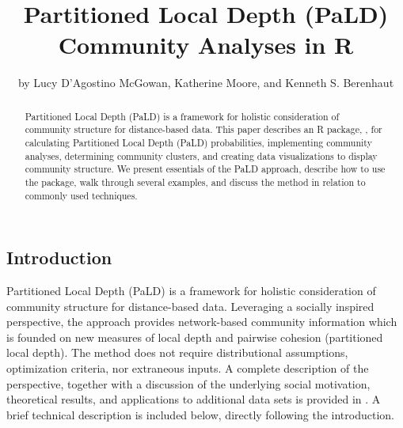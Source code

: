 \title{Partitioned Local Depth (PaLD) Community Analyses in R}

\author{by Lucy D'Agostino McGowan, Katherine Moore, and Kenneth S. Berenhaut}

\maketitle

\begin{abstract}%
Partitioned Local Depth (PaLD) is a framework for holistic consideration of community structure for distance-based data. This paper describes an R package, , for calculating Partitioned Local Depth (PaLD) probabilities, implementing community analyses, determining community clusters, and creating data visualizations to display community structure. We present essentials of the PaLD approach, describe how to use the  package, walk through several examples, and discuss the method in relation to commonly used techniques.
\end{abstract}

\hypertarget{introduction}{%
\subsection{Introduction}\label{introduction}}

Partitioned Local Depth (PaLD) is a framework for holistic
consideration of community structure for distance-based data. Leveraging
a socially inspired perspective, the approach provides network-based
community information which is founded on new measures of local depth
and pairwise cohesion (partitioned local depth). The method does not
require distributional assumptions, optimization criteria, nor
extraneous inputs. A complete description of the perspective, together
with a discussion of the underlying social motivation, theoretical
results, and applications to additional data sets is provided in \citet{berenhaut2022social}. A brief technical description is included below, directly following the introduction.


